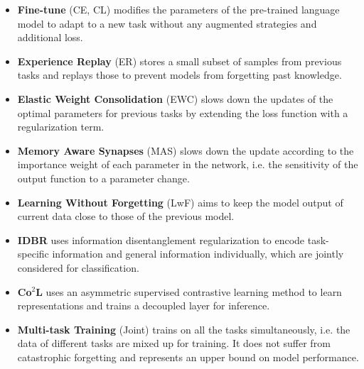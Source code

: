 \begin{itemize}
     \vspace{-2mm}
     \item \noindent \textbf{Fine-tune} (CE, CL) \cite{yogatama2019learning} modifies the parameters of the pre-trained language model to adapt to a new task without any augmented strategies and additional loss.
     \vspace{-2mm}
     \item \noindent \textbf{Experience Replay} (ER) \cite{riemer2019learning} stores a small subset of samples from previous tasks and replays those to prevent models from forgetting past knowledge. 
    \vspace{-2mm}
     \item \noindent \textbf{Elastic Weight Consolidation} (EWC) \cite{kirkpatrick2017overcoming} slows down the updates of the optimal parameters for previous tasks by extending the loss function with a regularization term. 
 \vspace{-2mm} 
     \item \noindent \textbf{Memory Aware Synapses} (MAS) \cite{aljundi2018memory} slows down the update according to the importance weight of each parameter in the network, i.e. the sensitivity of the output function to a parameter change. 
\vspace{-2mm} 
     \item \noindent \textbf{Learning Without Forgetting} (LwF) \cite{li2017learning,9156964}  aims to keep the model output of current data close to those of the previous model. 
  \vspace{-2mm} 
     \item \noindent \textbf{IDBR} \cite{huang2021continual} uses information  disentanglement regularization to encode task-specific information and general information individually, which are jointly considered for classification.
 \vspace{-2mm} 
      \item \noindent \textbf{Co$^2$L} \cite{cha2021co2l} uses an asymmetric supervised contrastive learning method to learn representations and trains  a decoupled  layer for inference.
  \vspace{-2mm}
      \item \noindent \textbf{Multi-task Training} (Joint) \cite{NEURIPS2020_3fe78a8a}  trains on all the tasks simultaneously, i.e. the data of different tasks are mixed up for training. It does not suffer from catastrophic forgetting and represents an upper bound on model performance. 
\end{itemize}










